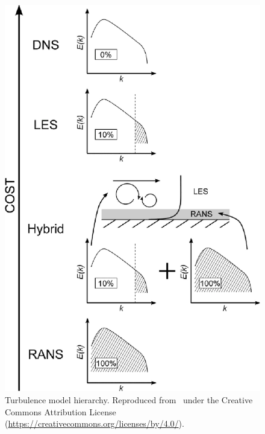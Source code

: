 \documentclass{ucb}
\begin{document}
\begin{figure}[h]\label{fig:HRLMS}
    \centering
    \includegraphics[]{img/TurbulenceModelsResolution_Tucker2015.jpg}
    \caption{Turbulence model hierarchy. Reproduced from~\cite{Tucker2015} under the Creative Commons Attribution License (\url{https://creativecommons.org/licenses/by/4.0/}).}
   
\end{figure}

\ucbbib{}
    
\end{document}
